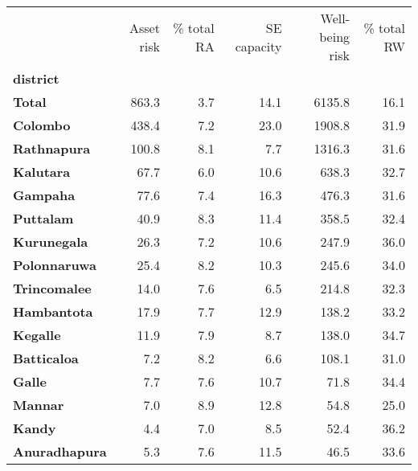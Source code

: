 \begin{tabular}{lrrrrr}
\toprule
{} &  Asset risk &  \% total RA &  SE capacity &  Well-being risk &  \% total RW \\
\textbf{district    } &             &             &              &                  &             \\
\midrule
\textbf{Total       } &       863.3 &         3.7 &         14.1 &           6135.8 &        16.1 \\
\textbf{Colombo     } &       438.4 &         7.2 &         23.0 &           1908.8 &        31.9 \\
\textbf{Rathnapura  } &       100.8 &         8.1 &          7.7 &           1316.3 &        31.6 \\
\textbf{Kalutara    } &        67.7 &         6.0 &         10.6 &            638.3 &        32.7 \\
\textbf{Gampaha     } &        77.6 &         7.4 &         16.3 &            476.3 &        31.6 \\
\textbf{Puttalam    } &        40.9 &         8.3 &         11.4 &            358.5 &        32.4 \\
\textbf{Kurunegala  } &        26.3 &         7.2 &         10.6 &            247.9 &        36.0 \\
\textbf{Polonnaruwa } &        25.4 &         8.2 &         10.3 &            245.6 &        34.0 \\
\textbf{Trincomalee } &        14.0 &         7.6 &          6.5 &            214.8 &        32.3 \\
\textbf{Hambantota  } &        17.9 &         7.7 &         12.9 &            138.2 &        33.2 \\
\textbf{Kegalle     } &        11.9 &         7.9 &          8.7 &            138.0 &        34.7 \\
\textbf{Batticaloa  } &         7.2 &         8.2 &          6.6 &            108.1 &        31.0 \\
\textbf{Galle       } &         7.7 &         7.6 &         10.7 &             71.8 &        34.4 \\
\textbf{Mannar      } &         7.0 &         8.9 &         12.8 &             54.8 &        25.0 \\
\textbf{Kandy       } &         4.4 &         7.0 &          8.5 &             52.4 &        36.2 \\
\textbf{Anuradhapura} &         5.3 &         7.6 &         11.5 &             46.5 &        33.6 \\

\end{tabular}

